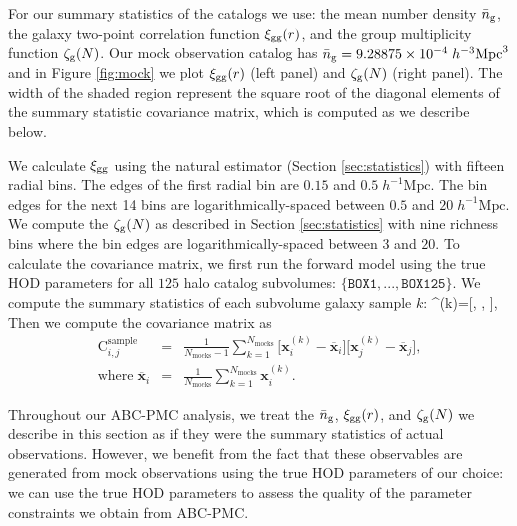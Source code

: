 For our summary statistics of the catalogs we use: 
the mean number density $\bar{n}_{\mathrm{g}}$, the galaxy two-point correlation function $\xi_{\mathrm{gg}}(r)$, 
and the group multiplicity function $\mathcal{\zeta}_{\rm g}(N)$. Our mock observation catalog has 
$\bar{n}_{\mathrm{g}} = 9.28875 \times 10^{-4} \;h^{-3} \mathrm{Mpc}^3$ and in Figure \ref{fig:mock} 
we plot $\xi_{\mathrm{gg}}(r)$ (left panel) and $\mathcal{\zeta}_{\rm g}(N)$ (right panel). The width of the shaded region
represent the square root of the diagonal elements of the summary statistic covariance matrix, 
which is computed as we describe below. 

We calculate $\xi_{\mathrm{gg}}$ using the natural estimator (Section \ref{sec:statistics}) with 
fifteen radial bins. The edges of the first radial bin are $0.15$ and $0.5 \; 
h^{-1}\mathrm{Mpc}$. The bin edges for the next 14 bins are logarithmically-spaced between 
$0.5$ and $20\;h^{-1}\mathrm{Mpc}$. We compute the $\mathcal{\zeta}_{\rm g}(N)$ as described in Section
\ref{sec:statistics} with nine richness bins where the bin edges are logarithmically-spaced 
between $3$ and $20$. To calculate the covariance matrix, we first run the forward model 
using the true HOD parameters for all $125$ halo catalog subvolumes: 
$\{\mathtt{BOX1}, ..., \mathtt{BOX125}\}$. 
We compute the summary statistics of each subvolume galaxy sample $k$: 
\beq
{}^{(k)}=[\ngalaxy, \; \xigg, \; \gmf],
\eeq
Then we compute the covariance matrix as
\begin{eqnarray} 
\mathrm{C}^\mathrm{sample}_{i,j} &=& 
\frac{1}{N_{\mathrm{mocks}}-1}\sum_{k=1}^{N_{\mathrm{mocks}}} 
\Big[\mathbf{x}^{(k)}_{i}-\overline{\mathbf{x}}_{i}\Big]
\Big[\mathbf{x}^{(k)}_{j}-\overline{\mathbf{x}}_{j}\Big], \label{eq:cov} \\
\mathrm{where} \; \overline{\mathbf{x}}_{i} &=& 
\frac{1}{N_{\mathrm{mocks}}}\sum_{k=1}^{N_{\mathrm{mocks}}} \mathbf{x}^{(k)}_{i}.
\end{eqnarray}

Throughout our ABC-PMC analysis, we treat the $\bar{n}_{\mathrm{g}}$, $\xi_{\mathrm{gg}}(r)$, and $\mathcal{\zeta}_{\rm g}(N)$ we describe in this 
section as if they were the summary statistics of actual observations. 
However, we benefit from the fact that these observables are generated from mock observations 
using the true HOD parameters of our choice: we can use the true HOD parameters to assess the 
quality of the parameter constraints we obtain from ABC-PMC. 

